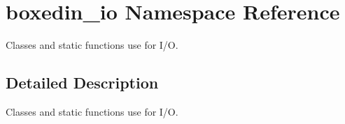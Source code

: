 \hypertarget{namespaceboxedin__io}{\section{boxedin\+\_\+io Namespace Reference}
\label{namespaceboxedin__io}
}


Classes and static functions use for I/\+O.  




\subsection{Detailed Description}
Classes and static functions use for I/\+O. 